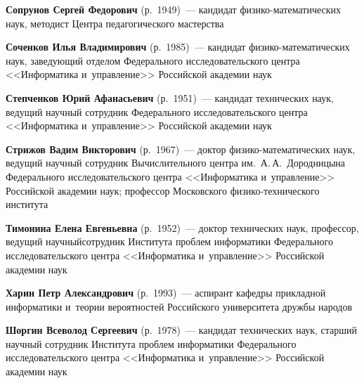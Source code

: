 \begin{multicols}{2}
\smallskip  

 \noindent
\textbf{Сопрунов Сергей Федорович} (р.\ 1949)~--- кандидат фи\-зи\-ко-ма\-те\-ма\-ти\-че\-ских  
наук, методист Цент\-ра педагогического мастерства

\smallskip  

\noindent
\textbf{Соченков Илья Владимирович} (р.\ 1985)~--- кандидат фи\-зи\-ко-ма\-те\-ма\-ти\-че\-ских 
наук, за\-ве\-ду\-ющий отделом Федерального исследовательского цент\-ра <<Информатика 
и~управ\-ле\-ние>> Российской академии \mbox{наук}

\smallskip 

\noindent
\textbf{Степченков Юрий Афанасьевич} (р.\ 1951)~--- кандидат технических наук, ведущий научный 
сотрудник Федерального исследовательского цент\-ра <<Информатика и~управ\-ле\-ние>> 
Российской академии наук

\smallskip 

 \noindent
\textbf{Стрижов Вадим Викторович} (р.\ 1967)~--- доктор фи\-зи\-ко-ма\-те\-ма\-ти\-че\-ских наук, 
ведущий научный сотрудник Вычислительного центра им.\ А.\,А.~Дородницына Федерального 
исследовательского цен\-тра <<Информатика и~управ\-ле\-ние>> Российской академии наук; 
профессор Московского фи\-зи\-ко-тех\-ни\-че\-ско\-го института


\smallskip 

 \noindent
\textbf{Тимонина Елена Евгеньевна} (р.\ 1952)~--- доктор технических наук, профессор, ведущий 
научный\linebreak сотрудник Института проб\-лем информатики Федерального исследовательского цент\-ра 
<<Информатика и~управ\-ле\-ние>> Российской академии наук

\smallskip

\vspace*{3.9pt}

  \noindent
\textbf{Харин Петр Александрович} (р.\ 1993)~--- аспирант кафедры прикладной информатики 
и~теории вероятностей Российского университета дружбы народов

\smallskip  

\vspace*{3.9pt}

\noindent
\textbf{Шоргин Всеволод Сергеевич} (р.\ 1978)~--- кандидат технических наук, старший 
научный сотрудник Института проб\-лем информатики Федерального исследовательского 
цент\-ра <<Информатика и~управ\-ле\-ние>> Российской академии наук

\smallskip  


\end{multicols}
